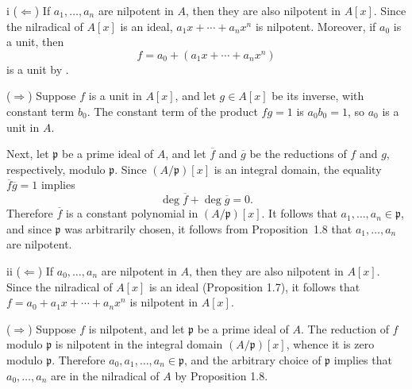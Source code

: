 \begin{partsolution}{i}
(\(\Leftarrow\))
If \(a_1,\ldots,a_n\) are nilpotent in \(A\), then they are also nilpotent in \(A[x]\).
Since the nilradical of \(A[x]\) is an ideal, \(a_1 x + \cdots + a_n x^n\) is nilpotent.
Moreover, if \(a_0\) is a unit, then
\begin{equation*}
f = a_0 + (a_1 x + \cdots + a_n x^n)
\end{equation*}
is a unit by .

(\(\Rightarrow\))
Suppose \(f\) is a unit in \(A[x]\), and let \(g \in A[x]\) be its inverse, with constant term \(b_0\).
The constant term of the product \(f g = 1\) is \(a_0 b_0 = 1\), so \(a_0\) is a unit in \(A\).

Next, let \(\mathfrak p\) be a prime ideal of \(A\), and let \(\overline f\) and \(\overline g\) be the reductions of \(f\) and \(g\), respectively, modulo \(\mathfrak p\).
Since \((A/\mathfrak p)[x]\) is an integral domain, the equality \(\overline f \overline g = 1\) implies
\begin{equation*}
\deg \overline f + \deg \overline g = 0.
\end{equation*}
Therefore \(\overline f\) is a constant polynomial in \((A/\mathfrak p)[x]\).
It follows that \(a_1,\ldots,a_n \in \mathfrak p\), and since \(\mathfrak p\) was arbitrarily chosen, it follows from Proposition~1.8 that \(a_1,\ldots, a_n\) are nilpotent.
\end{partsolution}

\begin{partsolution}{ii}
(\(\Leftarrow\))
If \(a_0,\ldots,a_n\) are nilpotent in \(A\), then they are also nilpotent in \(A[x]\).
Since the nilradical of \(A[x]\) is an ideal (Proposition 1.7), it follows that \(f = a_0 + a_1 x + \cdots + a_n x^n\) is nilpotent in \(A[x]\).

(\(\Rightarrow\))
Suppose \(f\) is nilpotent, and let \(\mathfrak p\) be a prime ideal of \(A\).
The reduction of \(f\) modulo \(\mathfrak p\) is nilpotent in the integral domain \((A/\mathfrak p)[x]\), whence it is zero modulo \(\mathfrak p\).
Therefore \(a_0,a_1,\ldots,a_n \in \mathfrak p\), and the arbitrary choice of \(\mathfrak p\) implies that \(a_0,\ldots,a_n\) are in the nilradical of \(A\) by Proposition 1.8.
\end{partsolution}

